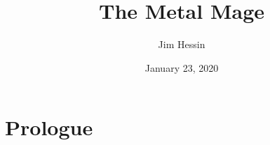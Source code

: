 \documentclass[letterpaper,twoside]{scrbook}
\title{The Metal Mage}
\author{Jim Hessin}
\date{January 23, 2020}
\begin{document}
\frontmatter
\maketitle
\tableofcontents
\chapter*{Prologue}

\mainmatter{}
\end{document}
